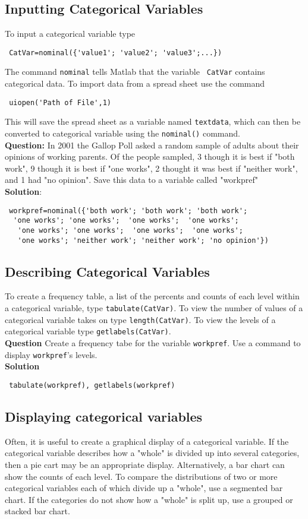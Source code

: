 \documentclass[10pt]{article}
\begin{document}
\subsection{Inputting Categorical Variables}
To input a categorical variable type \begin{verbatim} CatVar=nominal({'value1'; 'value2'; 'value3';...}) \end{verbatim} The command  \texttt{nominal} tells Matlab that the variable \texttt{ CatVar} contains categorical data. To import data from a spread sheet use the command
\begin{verbatim} uiopen('Path of File',1) \end{verbatim} This will save the spread sheet as a variable named \texttt{textdata}, which can then be converted to categorical variable using the \texttt{nominal()} command.
\\\textbf{Question:}
   In 2001 the Gallop Poll asked a random sample of adults about their opinions of working parents. Of the people sampled, 3 though it is best if "both work", 9 though it is best if "one works", 2 thought it was best if "neither work", and 1 had "no opinion". Save this data to a variable called "workpref" 
 \\\textbf{Solution}: 
  \begin{verbatim} workpref=nominal({'both work'; 'both work'; 'both work'; 
  'one works'; 'one works';  'one works';  'one works'; 
   'one works'; 'one works';  'one works';  'one works';  
   'one works'; 'neither work'; 'neither work'; 'no opinion'}) \end{verbatim}
   \subsection{Describing Categorical Variables}
To create a frequency table, a list of the percents and counts of each level within a categorical variable, type \verb|tabulate(CatVar)|. To view the number of values of a categorical variable takes on type \verb|length(CatVar)|. To view the levels of a categorical variable type \verb|getlabels(CatVar)|.
 \\\textbf{Question}
 Create a frequency tabe for the variable \texttt{workpref}. Use a command to display \texttt{workpref}'s levels.
 \\\textbf{Solution}
 \begin{verbatim} tabulate(workpref), getlabels(workpref) \end{verbatim}
 \subsection{Displaying categorical variables}
 Often, it is useful to create a graphical display of a categorical variable. If the categorical variable describes how a "whole" is divided up into several categories, then a pie cart may be an appropriate display. Alternatively, a bar chart can show the counts of each level. To compare the distributions of two or more categorical variables each of which divide up a "whole", use a segmented bar chart. If the categories do not show how a "whole" is split up, use a grouped or stacked bar chart.
\end{document}
